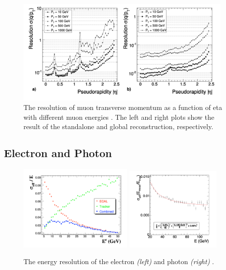 \begin{figure}[ht]
    \centering
    \includegraphics[width=0.95\textwidth]{chapters/CMSExperiment/sectionReconstruction/figures/resMu.png}
    \caption{The resolution of muon transverse momentum as a function of eta with different muon energies \cite{cms:tdr1:Bayatian:2006nff} . The left and right plots show the result of the standalone and global reconstruction, respectively.}
    \label{fig:cmsExperiment:reconstruction:resMu}
\end{figure}





\subsection{Electron and Photon}
\label{sec:cmsExperiment:reconstruction:egamma}


\begin{figure}[ht]
    \centering
    \includegraphics[width=0.5\textwidth]{chapters/CMSExperiment/sectionReconstruction/figures/resEle.png}
    \includegraphics[width=0.42\textwidth]{chapters/CMSExperiment/sectionReconstruction/figures/resGamma.png}
    \caption{The energy resolution of the electron \emph{(left)} and photon \emph{(right)} \cite{cms:tdr1:Bayatian:2006nff}.  }
    \label{fig:cmsExperiment:reconstruction:resEle}
\end{figure}

